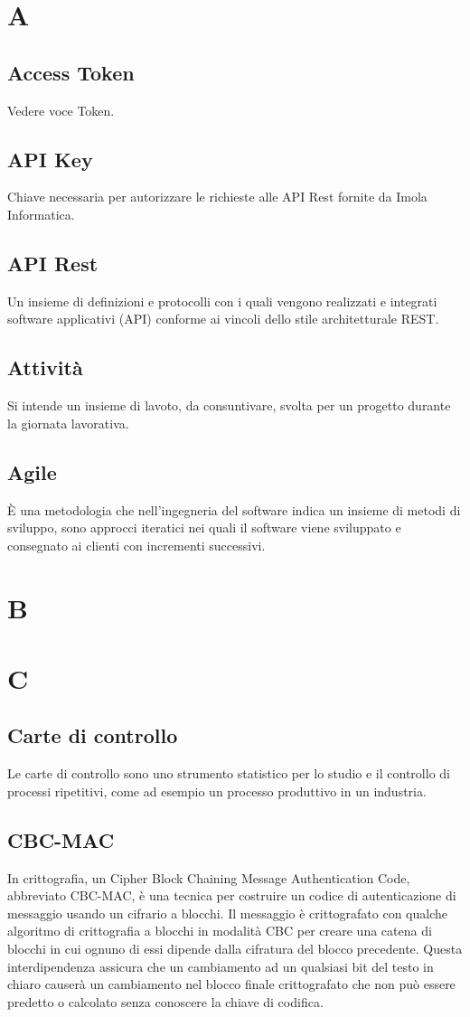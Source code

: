 \section{A}
\subsection{Access Token}
Vedere voce Token.
\subsection{API Key}
Chiave necessaria per autorizzare le richieste alle API Rest fornite da Imola Informatica.
\subsection{API Rest}
Un insieme di definizioni e protocolli con i quali vengono realizzati e integrati software applicativi (API) conforme ai vincoli dello stile architetturale REST.
\subsection{Attività}
Si intende un insieme di lavoto, da consuntivare, svolta per un progetto durante la giornata lavorativa.
\subsection{Agile}
È una metodologia che nell'ingegneria del software indica un insieme di metodi di sviluppo, sono approcci iteratici nei quali il software viene sviluppato e consegnato ai clienti con incrementi successivi.
\newpage
\section{B}
\section{C}
\subsection{Carte di controllo}
Le carte di controllo sono uno strumento statistico per lo studio e il controllo di processi ripetitivi, come ad esempio un processo produttivo in un industria.
\subsection{CBC-MAC}
In crittografia, un Cipher Block Chaining Message Authentication Code, abbreviato CBC-MAC, è una tecnica per costruire un codice di autenticazione di messaggio usando un cifrario a blocchi. Il messaggio è crittografato con qualche algoritmo di crittografia a blocchi in modalità CBC per creare una catena di blocchi in cui ognuno di essi dipende dalla cifratura del blocco precedente. Questa interdipendenza assicura che un cambiamento ad un qualsiasi bit del testo in chiaro causerà un cambiamento nel blocco finale crittografato che non può essere predetto o calcolato senza conoscere la chiave di codifica.
